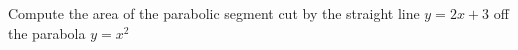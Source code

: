 
%
%
%
%
% 
% 

\question Compute the area of the parabolic segment cut by the straight line 
$y=2x + 3$ off the parabola $y=x^2$

\insertQR{}

